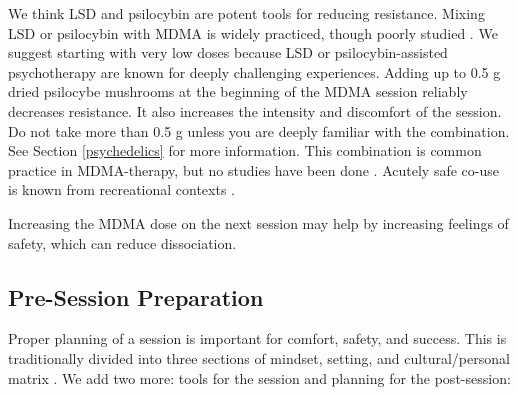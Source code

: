 \documentclass[12pt,letterpaper]{book}
\begin{document}
We think LSD and psilocybin are potent tools for reducing resistance.  Mixing LSD or psilocybin with MDMA is widely practiced, though poorly studied \cite{zeifmanCo-use}. We suggest starting with very low doses because LSD or psilocybin-assisted psychotherapy are known for deeply challenging experiences. Adding up to 0.5 g dried psilocybe mushrooms at the beginning of the MDMA session reliably decreases resistance. It also increases the intensity and discomfort of the session. Do not take more than 0.5 g unless you are deeply familiar with the combination. See Section \ref{psychedelics} for more information. This combination is common practice in MDMA-therapy, but no studies have been done \cite{colemanPsychedelicPsychotherapy}. Acutely safe co-use is known from recreational contexts \cite{zeifmanCo-use}.

Increasing the MDMA dose on the next session may help by increasing feelings of safety, which can reduce dissociation.
\subsection{Pre-Session Preparation}
\label{prep}
Proper planning of a session is important for comfort, safety, and success. This is traditionally divided into three sections of mindset, setting, and cultural/personal matrix \cite{setSettingMatrix}. We add two more: tools for the session and planning for the post-session:

\vspace{\baselineskip}
\end{document}

